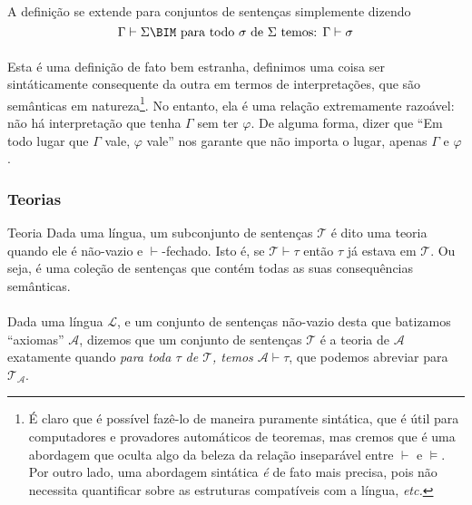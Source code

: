         \paragraph{}
            A definição se extende para conjuntos de sentenças simplemente dizendo
            $$\Gamma\vdash\Sigma\BIM\text{ para todo $\sigma$ de $\Sigma$ temos: } \Gamma\vdash\sigma$$

        \paragraph{}
            Esta é uma definição de fato bem estranha, definimos uma coisa ser sintáticamente
            consequente da outra em termos de interpretações, que são semânticas em
            natureza\footnote{
                É claro que é possível fazê-lo de maneira puramente sintática, que é útil
                para computadores e provadores automáticos de teoremas, mas cremos que é
                uma abordagem que oculta algo da beleza da relação inseparável entre $\vdash$
                e $\vDash$.\\
                Por outro lado, uma abordagem sintática {\em é} de fato mais precisa, pois não
                necessita quantificar sobre as estruturas compatíveis com a língua,
                {\em etc.}
            }. No entanto,
            ela é uma relação extremamente razoável: não há interpretação que tenha $\Gamma$
            sem ter $\varphi$. De alguma forma, dizer que ``Em todo lugar que $\Gamma$ vale,
            $\varphi$ vale'' nos garante que não importa o lugar, apenas $\Gamma$ e $\varphi$. %

        \subsubsection{Teorias}
        \begin{definition}{Teoria}
                Dada uma língua, um subconjunto de sentenças $\mathcal{T}$ é dito uma teoria
                quando ele é não-vazio e $\vdash$-fechado. Isto é, se $\mathcal{T}\vdash\tau$
                então $\tau$ já estava em $\mathcal{T}$. Ou seja, é uma coleção de sentenças
                que contém todas as suas consequências semânticas.
        \end{definition}
        \paragraph{}
            \newcommand{\theoryof}[1]{\mathcal{T}_{#1}}
            Dada uma língua $\mathcal{L}$, e um conjunto de sentenças não-vazio desta que batizamos ``axiomas''
            $\mathcal{A}$, dizemos que um conjunto de sentenças $\mathcal{T}$ é a teoria de
            $\mathcal{A}$ exatamente quando {\em para toda $\tau$ de $\mathcal{T}$, temos
            $\mathcal{A}\vdash\tau$}, que podemos abreviar para $\theoryof{\mathcal{A}}$.
